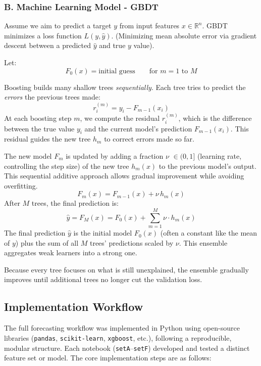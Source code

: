 \subsubsection*{B. Machine Learning Model - GBDT}
Assume we aim to predict a target $y$ from input features $x \in \mathbb{R}^n$. 
GBDT minimizes a loss function $L(y, \hat{y})$. (Minimizing mean absolute error via 
gradient descent between a predicted $\hat{y}$ and true $y$ value).

Let:
\[
F_0(x) = \text{initial guess} \quad\quad \text{for } m = 1 \text{ to } M
\]

Boosting builds many shallow trees \emph{sequentially}.  
Each tree tries to predict the \emph{errors} the previous trees made:
    \[
    r_i^{(m)} = y_i - F_{m-1}(x_i)
    \]
At each boosting step $m$, we compute the residual $r_i^{(m)}$, which is the difference 
between the true value $y_i$ and the current model’s prediction $F_{m-1}(x_i)$.
This residual guides the new tree $h_m$ to correct errors made so far.

The new model $F_m$ is updated by adding a fraction $\nu$ $\in (0, 1]$ (learning rate, 
controlling the step size) of the new tree $h_m(x)$ to the previous model’s output.
This sequential additive approach allows gradual improvement while avoiding overfitting.
    \[
    F_m(x) = F_{m-1}(x) + \nu\,h_m(x)
    \]
After $M$ trees, the final prediction is:
    \[
    \hat{y} = F_M(x) = F_0(x) + \sum_{m=1}^{M} \nu \cdot h_m(x)
    \] 
The final prediction $\hat{y}$ is the initial model $F_0(x)$ (often a constant 
like the mean of $y$) plus the sum of all $M$ trees' predictions scaled by $\nu$.
This ensemble aggregates weak learners into a strong one. 

Because every tree focuses on what is still unexplained, the ensemble
gradually improves until additional trees no longer cut the validation loss.

\subsection{Implementation Workflow}
\label{subsec:implementation}

The full forecasting workflow was implemented in Python using open-source libraries 
(\texttt{pandas}, \texttt{scikit-learn}, \texttt{xgboost}, etc.), following a 
reproducible, modular structure. Each notebook (\texttt{setA}–\texttt{setF}) 
developed and tested a distinct feature set or model. The core implementation steps 
are as follows:

